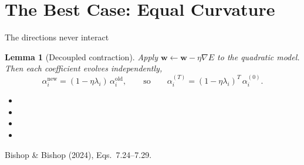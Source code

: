 \documentclass[aspectratio=169, 11pt]{beamer}
\newtheorem{lemmax}[theorem]{Lemma}
\newcommand{\srcline}[1]{%
  \par\vspace{0.25em}%
  {\scriptsize\color{mcMuted}\hfill #1\par}}
\newcommand{\src}[3]{}      %
\begin{document}
\section{The Best Case: Equal Curvature}

\begin{frame}{The directions never interact}
  \src{bishop2024}{equation}{7.24-7.29}
  \src{bishop2024}{section}{7.3}
  \vspace{-0.25em}
  \begin{lemmax}[Decoupled contraction]\label{th:decay}
    \small
    Apply $\mathbf{w} \leftarrow \mathbf{w} - \eta \nabla E$ to the quadratic model. Then
    each coefficient evolves independently,
    \[
      \alpha_i^{\text{new}} = (1 - \eta\lambda_i)\,\alpha_i^{\text{old}},
      \qquad\text{so}\qquad
      \alpha_i^{(T)} = (1 - \eta\lambda_i)^{T}\,\alpha_i^{(0)} .
    \]
  \end{lemmax}
  \vspace{0.05em}
  {\footnotesize
  \begin{itemize}\itemsep0.26em
    \item {}
    \item {}
    \item {}
    \item {}
  \end{itemize}}
  \vspace{-0.3em}
  \srcline{Bishop \& Bishop (2024), Eqs.~7.24--7.29.}
\end{frame}
\end{document}

